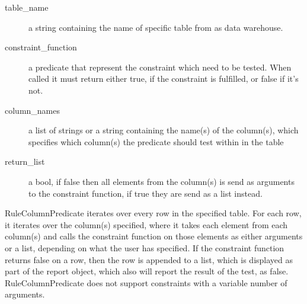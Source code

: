 
\begin{description}
\item [table\_name] a string containing the name of specific table from as data warehouse. 
\item [constraint\_function] a predicate that represent the constraint which need to be tested. When called it must return either true, if the constraint is fulfilled, or false if it's not.
\item [column\_names] a list of strings or a string containing the name(s) of the column(s), which specifies which column(s) the predicate should test within in the table
\item [return\_list] a bool, if false then all elements from the column(s) is send as arguments to the constraint function, if true they are send as a list instead.
\end{description}

RuleColumnPredicate iterates over every row in the specified table. For each row, it iterates over the column(s) specified, where it takes each element from each column(s) and calls the constraint function on those elements as either arguments or a list, depending on what the user has specified. If the constraint function returns false on a row, then the row is appended to a list, which is displayed as part of the report object, which also will report the result of the test, as false. RuleColumnPredicate does not support constraints with a variable number of arguments.


